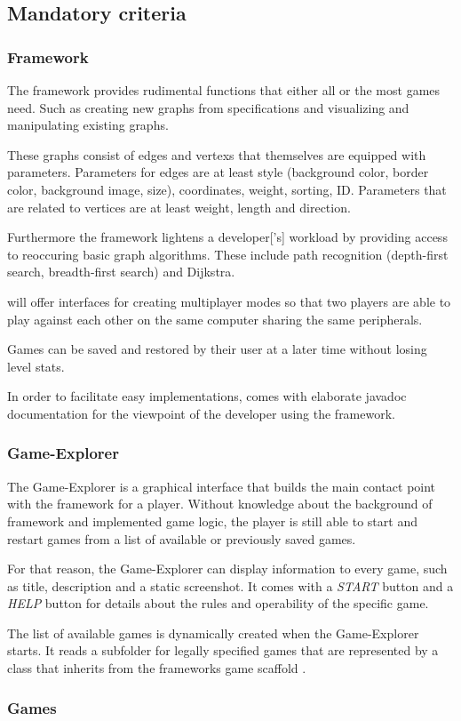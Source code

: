 \subsection{Mandatory criteria}
\subsubsection{Framework}
The framework provides rudimental functions that either all or the most games need. Such as creating new graphs from specifications and visualizing and manipulating existing graphs.\par
These graphs consist of \glspl{edge} and \glspl{vertex} that themselves are equipped with parameters. Parameters for edges are at least style (background color, border color, background image, size), coordinates, weight, sorting, \gls{ID}. Parameters that are related to vertices are at least weight, length and direction.\par
Furthermore the framework lightens a \gls{developer}['s] workload by providing access to reoccuring basic graph algorithms. These include path recognition (depth-first search, breadth-first search) and Dijkstra.\par {}
\graphioli will offer interfaces for creating multiplayer modes so that two \glspl{player} are able to play against each other on the same computer sharing the same peripherals.\par
Games can be saved and restored by their user at a later time without losing \gls{level} stats.\par
In order to facilitate easy implementations, \graphioli comes with elaborate \Gls{javadoc} documentation for the viewpoint of the developer using the framework.\par {}

\subsubsection{Game-Explorer}
The Game-Explorer is a graphical interface that builds the main contact point with the framework for a player. Without knowledge about the background of framework and implemented game logic, the player is still able to start and restart games from a list of available or previously saved games.\par
For that reason, the Game-Explorer can display information to every game, such as title, description and a static screenshot. It comes with a \emph{START} button  and a \emph{HELP} button for details about the rules and operability of the specific game.\par
The list of available games is dynamically created when the Game-Explorer starts. It reads a subfolder for legally specified games that are represented by a class that inherits from the frameworks game scaffold .

\subsubsection{Games}
